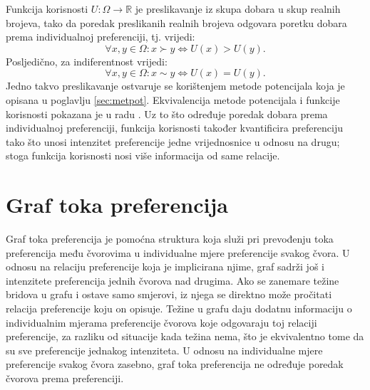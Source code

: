 \documentclass[lmodern, utf8, diplomski, numeric]{fer}
\newcommand{\q}{\left}
\newcommand{\w}{\right}
\begin{document}
  Funkcija korisnosti  $U\colon \Omega \to \mathbb{R}$ je preslikavanje iz skupa dobara u skup realnih brojeva, tako da poredak preslikanih realnih brojeva odgovara poretku dobara prema individualnoj preferenciji, tj. vrijedi:
  \begin{equation*}
    \forall x, y \in \Omega \colon x \succ y \Leftrightarrow U\q(x\w) > U\q(y\w).
  \end{equation*}
  Posljedično, za indiferentnost vrijedi:
  \begin{equation*}
    \forall x, y \in \Omega \colon x \sim y \Leftrightarrow U\q(x\w) = U\q(y\w).
  \end{equation*}
  Jedno takvo preslikavanje ostvaruje se korištenjem metode potencijala koja je opisana u poglavlju \ref{sec:metpot}.
  Ekvivalencija metode potencijala i funkcije korisnosti pokazana je u radu \citep{metpotexact}.
  Uz to što određuje poredak dobara prema individualnoj preferenciji, funkcija korisnosti također kvantificira preferenciju tako što unosi intenzitet preferencije jedne vrijednosnice u odnosu na drugu; stoga funkcija korisnosti nosi više informacija od same relacije.

  \section{Graf toka preferencija}
  Graf toka preferencija je pomoćna struktura koja služi pri prevođenju toka preferencija među čvorovima u individualne mjere preferencije svakog čvora.
  U odnosu na relaciju preferencije koja je implicirana njime, graf sadrži još i intenzitete preferencija jednih čvorova nad drugima.
  Ako se zanemare težine bridova u grafu i ostave samo smjerovi, iz njega se direktno može pročitati relacija preferencije koju on opisuje.
  Težine u grafu daju dodatnu informaciju o individualnim mjerama preferencije čvorova koje odgovaraju toj relaciji preferencije, za razliku od situacije kada težina nema, što je ekvivalentno tome da su sve preferencije jednakog intenziteta.
  U odnosu na individualne mjere preferencije svakog čvora zasebno, graf toka preferencija ne određuje poredak čvorova prema preferenciji.
  
\end{document}
